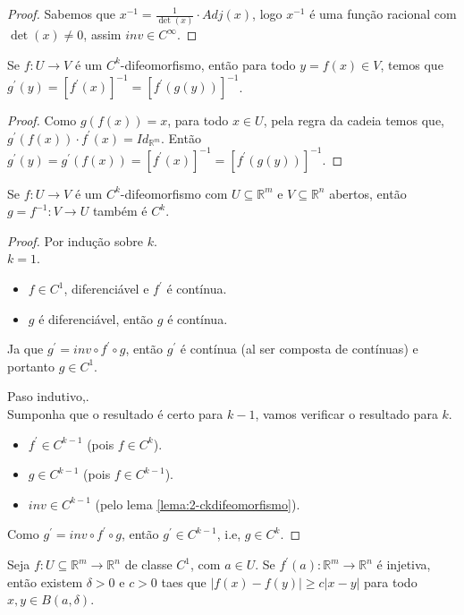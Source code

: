 \begin{proof} 
  Sabemos que $x^{-1}=\frac{1}{\det(x)}\cdot Adj(x)$, logo $x^{-1}$ é uma função racional com $\det(x)\neq 0$, assim $inv\in C^{\infty}$. 
\end{proof}
\begin{lemma}\label{lema:2-ckdifeomorfismo}
  Se $f:U\to V$ é um $C^{k}$-difeomorfismo, então para todo $y=f(x)\in V$, temos que $g^{\prime}(y)=\left[ f^{\prime}(x) \right]^{-1}=\left[ f^{\prime}\left( g(y) \right) \right]^{-1}$.
\end{lemma}
\begin{proof} 
  Como $g(f(x))=x$, para todo $x\in U$, pela regra da cadeia temos que, $g^{\prime}(f(x))\cdot f^{\prime}(x)=Id_{\mathbb{R}^{m}}$. Então $g^{\prime}(y)=g^{\prime}\left( f(x) \right)=\left[ f^{\prime}(x) \right]^{-1}=\left[ f^{\prime}(g(y)) \right]^{-1}$.
\end{proof}
\begin{theorem}\label{teo:3.6-teorema1}
  Se $f:U\to V$ é um $C^{k}$-difeomorfismo com $U\subseteq \mathbb{R}^{m}$ e $V\subseteq\mathbb{R}^{n}$ abertos, então $g=f^{-1}:V\to U$ também é $C^{k}$. 
\end{theorem}
\begin{proof} 
  Por indução sobre $k$.\\
  $k=1$.
  \begin{itemize}
    \item $f\in C^{1}$, diferenciável e $f^{\prime}$ é contínua.
    \item $g$ é diferenciável, então $g$ é contínua. 
  \end{itemize}
  Ja que $g^{\prime}=inv\circ f^{\prime}\circ g$, então $g^{\prime}$ é contínua (al ser composta de contínuas) e portanto $g\in C^{1}$.

  Paso indutivo,.\\
  Sumponha que o resultado é certo para $k-1$, vamos verificar o resultado para $k$.
  \begin{itemize}
    \item $f^{\prime}\in C^{k-1}$ (pois $f\in C^{k}$).
    \item $g\in C^{k-1}$ (pois $f\in C^{k-1}$).
    \item $inv\in C^{k-1}$ (pelo lema \ref{lema:2-ckdifeomorfismo}).
  \end{itemize}
  Como $g^{\prime}=inv\circ f^{\prime}\circ g$, então $g^{\prime}\in C^{k-1}$, i.e, $g\in C^{k}$.
\end{proof}
\begin{theorem}\label{teo:3.6-teorema2}
  Seja $f:U\subseteq \mathbb{R}^{m}\to\mathbb{R}^{n}$ de classe $C^{1}$, com $a\in U$. Se $f^{\prime}(a):\mathbb{R}^{m}\to\mathbb{R}^{n}$ é injetiva, então existem $\delta>0$ e $c>0$ taes que $|f(x)-f(y)|\geq c|x-y|$ para todo $x,y\in B(a,\delta)$. 
\end{theorem}
